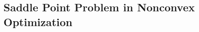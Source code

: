 \subsection{Saddle Point Problem in Nonconvex Optimization}

  \cite{2014pascanu_saddle-point-nonconvex}

